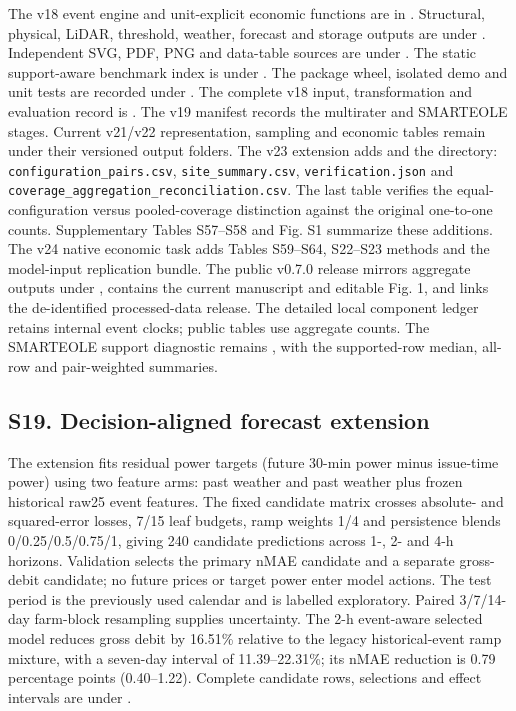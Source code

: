 \documentclass[a4paper,11pt]{article}
\begin{document}
The v18 event engine and unit-explicit economic functions are in . Structural, physical, LiDAR, threshold, weather, forecast and storage outputs are under . Independent SVG, PDF, PNG and data-table sources are under . The static support-aware benchmark index is under . The package wheel, isolated demo and unit tests are recorded under . The complete v18 input, transformation and evaluation record is . The v19 manifest records the multirater and SMARTEOLE stages. Current v21/v22 representation, sampling and economic tables remain under their versioned output folders. The v23 extension adds  and the  directory: \texttt{configuration\_pairs.csv}, \texttt{site\_summary.csv}, \texttt{verification.json} and \texttt{coverage\_aggregation\_reconciliation.csv}. The last table verifies the equal-configuration versus pooled-coverage distinction against the original one-to-one counts. Supplementary Tables S57--S58 and Fig. S1 summarize these additions. The v24 native economic task adds Tables S59--S64, S22--S23 methods and the model-input replication bundle. The public v0.7.0 release mirrors aggregate outputs under , contains the current manuscript and editable Fig. 1, and links the de-identified processed-data release. The detailed local component ledger retains internal event clocks; public tables use aggregate counts. The SMARTEOLE support diagnostic remains , with the supported-row median, all-row and pair-weighted summaries.

\subsection{S19. Decision-aligned forecast extension}\label{s19.-decision-aligned-forecast-extension}

The extension fits residual power targets (future 30-min power minus issue-time power) using two feature arms: past weather and past weather plus frozen historical raw25 event features. The fixed candidate matrix crosses absolute- and squared-error losses, 7/15 leaf budgets, ramp weights 1/4 and persistence blends 0/0.25/0.5/0.75/1, giving 240 candidate predictions across 1-, 2- and 4-h horizons. Validation selects the primary nMAE candidate and a separate gross-debit candidate; no future prices or target power enter model actions. The test period is the previously used calendar and is labelled exploratory. Paired 3/7/14-day farm-block resampling supplies uncertainty. The 2-h event-aware selected model reduces gross debit by 16.51\% relative to the legacy historical-event ramp mixture, with a seven-day interval of 11.39--22.31\%; its nMAE reduction is 0.79 percentage points (0.40--1.22). Complete candidate rows, selections and effect intervals are under .
\end{document}

